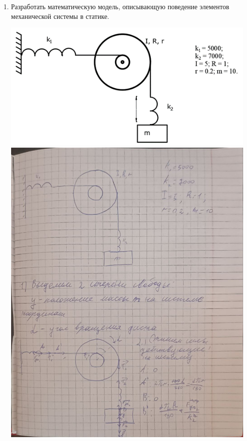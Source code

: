 \documentclass[a4paper,14pt]{extarticle}
\begin{document}
\begin{enumerate}[1. ]
    \item Разработать математическую модель, описывающую поведение элементов механической системы в статике.\\
          \begin{center}
              \includegraphics[width=140mm]{variant.png}
              \bigbreak
              \includegraphics[width=140mm]{mod1.jpg}

\end{center}
\end{enumerate}
\end{document}
